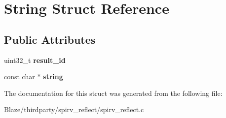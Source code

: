 \hypertarget{structString}{}\section{String Struct Reference}
\label{structString}
\subsection*{Public Attributes}
\begin{DoxyCompactItemize}
\item 
\mbox{\label{structString_a99c2b9559a501260e9e9e8114519dab5}} 
uint32\+\_\+t {\bfseries result\+\_\+id}
\item 
\mbox{\label{structString_a2b0fbb4b57d26e908d6fb717f4779b38}} 
const char $\ast$ {\bfseries string}
\end{DoxyCompactItemize}


The documentation for this struct was generated from the following file\+:\begin{DoxyCompactItemize}
\item 
Blaze/thirdparty/spirv\+\_\+reflect/spirv\+\_\+reflect.\+c\end{DoxyCompactItemize}
